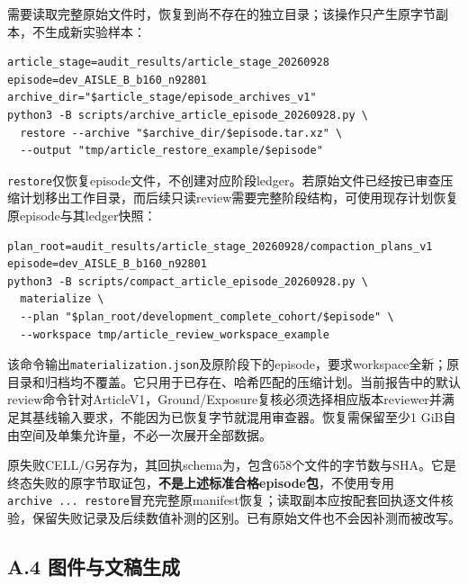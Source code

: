 \documentclass[11pt,a4paper]{article}
\numberwithin{equation}{section}
\begin{document}
需要读取完整原始文件时，恢复到尚不存在的独立目录；该操作只产生原字节副本，不生成新实验样本：

\par\medskip\noindent\begin{minipage}{\linewidth}
\begin{verbatim}
article_stage=audit_results/article_stage_20260928
episode=dev_AISLE_B_b160_n92801
archive_dir="$article_stage/episode_archives_v1"
python3 -B scripts/archive_article_episode_20260928.py \
  restore --archive "$archive_dir/$episode.tar.xz" \
  --output "tmp/article_restore_example/$episode"
\end{verbatim}
\end{minipage}\par\medskip


\texttt{restore}仅恢复episode文件，不创建对应阶段ledger。若原始文件已经按已审查压缩计划移出工作目录，而后续只读review需要完整阶段结构，可使用现存计划恢复原episode与其ledger快照：

\par\medskip\noindent\begin{minipage}{\linewidth}
\begin{verbatim}
plan_root=audit_results/article_stage_20260928/compaction_plans_v1
episode=dev_AISLE_B_b160_n92801
python3 -B scripts/compact_article_episode_20260928.py \
  materialize \
  --plan "$plan_root/development_complete_cohort/$episode" \
  --workspace tmp/article_review_workspace_example
\end{verbatim}
\end{minipage}\par\medskip


该命令输出\texttt{materialization.json}及原阶段下的episode，要求workspace全新；原目录和归档均不覆盖。它只用于已存在、哈希匹配的压缩计划。当前报告中的默认review命令针对ArticleV1，Ground/Exposure复核必须选择相应版本reviewer并满足其基线输入要求，不能因为已恢复字节就混用审查器。恢复需保留至少1 GiB自由空间及单集允许量，不必一次展开全部数据。

原失败CELL/G另存为，其回执schema为，包含658个文件的字节数与SHA。它是终态失败的原字节取证包，\textbf{不是上述标准合格episode包}，不使用专用\texttt{archive\ ...\ restore}冒充完整原manifest恢复；读取副本应按配套回执逐文件核验，保留失败记录及后续数值补测的区别。已有原始文件也不会因补测而被改写。

\hypertarget{a.4-ux56feux4ef6ux4e0eux6587ux7a3fux751fux6210}{%
\subsection*{A.4 图件与文稿生成}\label{a.4-ux56feux4ef6ux4e0eux6587ux7a3fux751fux6210}}
\end{document}
